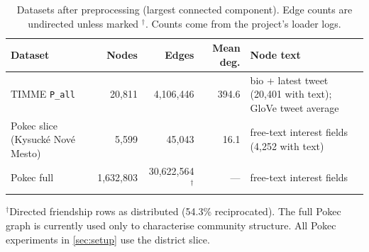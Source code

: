 \begin{table}[t]
\centering
\caption{Datasets after preprocessing (largest connected component). Edge counts are
undirected unless marked $^{\dagger}$. Counts come from the project's loader logs.}
\label{tab:datasets}
\small
\begin{tabularx}{\linewidth}{@{}l r r r >{\raggedright\arraybackslash}X@{}}
\toprule
Dataset & Nodes & Edges & Mean deg. & Node text \\
\midrule
TIMME \texttt{P\_all}          & 20,811    & 4,106,446  & 394.6 & bio + latest tweet (20,401 with text); GloVe tweet average \\
Pokec slice (Kysuck\'e Nov\'e Mesto) & 5,599 & 45,043 & 16.1 & free-text interest fields (4,252 with text) \\
Pokec full                    & 1,632,803 & 30,622,564$^{\dagger}$ & --- & free-text interest fields \\
\bottomrule
\end{tabularx}

\smallskip
\raggedright\footnotesize
$^{\dagger}$Directed friendship rows as distributed (54.3\% reciprocated). The full
Pokec graph is currently used only to characterise community structure. All Pokec
experiments in \cref{sec:setup} use the district slice.
\end{table}
